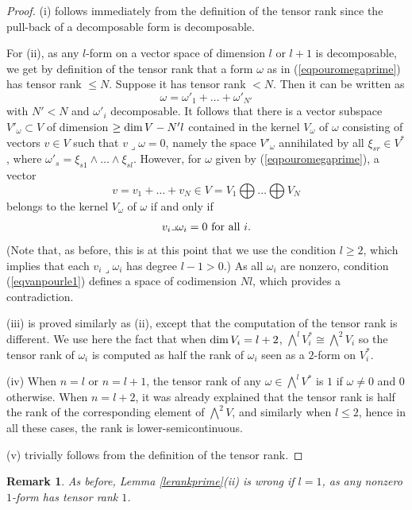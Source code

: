 \documentclass[10pt]{article}
\newtheorem{rema}[theo]{Remark}
\begin{document}
\begin{proof} (i) follows immediately from the definition of the tensor rank since the pull-back of a decomposable form is decomposable.

For (ii), as any $l$-form on a vector space of dimension $l$ or $l+1$ is decomposable, we get by definition of the tensor rank that a form $\omega$ as in (\ref{eqpouromegaprime}) has tensor rank $\leq N$.  Suppose it has tensor rank $<N$. Then it can be written as
$$\omega=\omega'_1+\ldots+\omega'_{N'}$$
with $N'<N$ and $\omega'_i$ decomposable. It follows that there is a vector subspace $V'_\omega\subset V$ of dimension $\geq {\rm dim}\,V-N'l$ contained in the kernel $V_\omega$ of $\omega$ consisting of vectors $v\in V$ such that $v\lrcorner\omega=0$, namely the space  $V'_\omega$  annihilated by all $\xi_{sr}\in V^*$, where
$\omega'_{s}=\xi_{s1}\wedge\ldots\wedge \xi_{sl}$.
However, for $\omega$ given by (\ref{eqpouromegaprime}), a vector $$v=v_1+\ldots+ v_N\in V=V_1\bigoplus \ldots\bigoplus V_N$$ belongs to the kernel  $V_\omega$ of $\omega$ if and only if \begin{eqnarray}\label{eqvanpourle1}v_i\lrcorner\omega_i=0\,\,{\rm  for\,\, all}\,\, i. \end{eqnarray}
(Note that, as before, this is at this point that we use the condition $l\geq 2$, which implies that each $v_i\lrcorner\omega_i$ has degree $l-1>0$.)
As all $\omega_i$ are nonzero, condition (\ref{eqvanpourle1}) defines a space of codimension $Nl$, which provides  a contradiction.

(iii) is proved similarly as (ii), except that the computation of the tensor rank is different. We use here the fact that when ${\rm dim}\,V_i=l+2$, $\bigwedge^lV_i^*\cong \bigwedge^2V_i$ so the tensor rank of $\omega_i$ is computed as half the rank of $\omega_i$ seen as a $2$-form on $V_i^*$.

(iv) When $n=l$ or $n=l+1$, the tensor rank of any $\omega\in \bigwedge^lV^*$ is $1$ if $\omega\not=0$ and $0$ otherwise. When $n=l+2$, it was already explained  that the tensor rank is half the rank of the corresponding element of $\bigwedge^2V$, and similarly when $l\leq 2$, hence in all these cases, the rank  is lower-semicontinuous.

(v) trivially follows from the definition of the tensor rank.
\end{proof}
\begin{rema}{\rm As before, Lemma \ref{lerankprime}(ii) is  wrong if $l=1$, as any nonzero $1$-form has  tensor rank $1$.}\end{rema}
\end{document}
